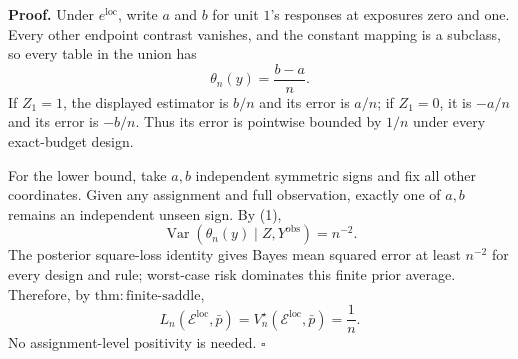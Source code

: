 \textbf{Proof.}
Under \(e^{\mathrm{loc}}\), write \(a\) and \(b\) for unit \(1\)'s responses at exposures zero and one. Every other endpoint contrast vanishes, and the constant mapping is a subclass, so every table in the union has
\[
 \theta_n(y)=\frac{b-a}{n}. \tag{1}
\]
If \(Z_1=1\), the displayed estimator is \(b/n\) and its error is \(a/n\); if \(Z_1=0\), it is \(-a/n\) and its error is \(-b/n\). Thus its error is pointwise bounded by \(1/n\) under every exact-budget design.

For the lower bound, take \(a,b\) independent symmetric signs and fix all other coordinates. Given any assignment and full observation, exactly one of \(a,b\) remains an independent unseen sign. By (1),
\[
 \operatorname{Var}(\theta_n(y)\mid Z,Y^{\mathrm{obs}})=n^{-2}.
\]
The posterior square-loss identity gives Bayes mean squared error at least \(n^{-2}\) for every design and rule; worst-case risk dominates this finite prior average. Therefore, by \(\mathrm{thm{:}finite\text{-}saddle}\),
\[
 L_n(\mathcal E^{\mathrm{loc}},\bar p)
 =V_n^\star(\mathcal E^{\mathrm{loc}},\bar p)=\frac1n.
\]
No assignment-level positivity is needed. \(\square\)